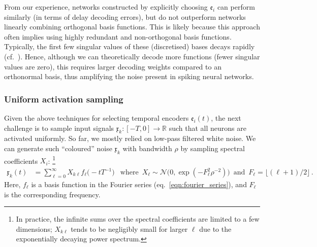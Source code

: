 From our experience, networks constructed by explicitly choosing $\mathfrak{e}_i$ can perform similarly (in terms of delay decoding errors), but do not outperform networks linearly combining orthogonal basis functions.
This is likely because this approach often implies using highly redundant and non-orthogonal basis functions.
Typically, the first few singular values of these (discretised) bases decays rapidly (cf.~).
Hence, although we can theoretically decode more functions (fewer singular values are zero), this requires larger decoding weights compared to an orthonormal basis, thus amplifying the noise present in spiking neural networks.


\subsubsection{Uniform activation sampling}

Given the above techniques for selecting temporal encoders $\mathfrak{e}_i(t)$, the next challenge is to sample input signals $\mathfrak{x}_k : [-T, 0] \longrightarrow \mathbb{R}$ such that all neurons are activated uniformly.
So far, we mostly relied on low-pass filtered white noise.
We can generate such \enquote{coloured} noise $\mathfrak{x}_k$ with bandwidth $\rho$ by sampling spectral coefficients $X_i$:%
\footnote{In practice, the infinite sums over the spectral coefficients are limited to a few dimensions; $X_{k\ell}$ tends to be negligibly small for larger $\ell$ due to the exponentially decaying power spectrum.}
\begin{align}
	\mathfrak{x}_k(t) &= \sum\nolimits_{\ell = 0}^\infty X_{k\ell} f_\ell\bigl(-tT^{-1}\bigr) & \text{where } \, X_\ell \sim \mathcal{N}\bigl(0, \exp(-F_\ell^2 \rho^{-2})\bigr) \, \text{ and } \, F_\ell = \bigl\lfloor (\ell + 1) / 2 \bigr\rfloor \,.
	\label{eqn:low_pass_white_noise}
\end{align}
Here, $f_\ell$ is a basis function in the Fourier series (eq.~\ref{eqn:fourier_series}), and $F_\ell$ is the corresponding frequency.


